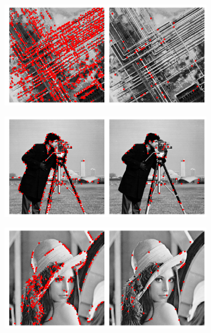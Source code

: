 \documentclass[12pt,a4paper,onecolumn]{article}
\begin{document}
\begin{figure}[H]
	\centering
	\begin{subfigure}[b]{\textwidth}
		\centering
		\includegraphics[height = 0.20\textheight]{1_bouc}
		\label{fig_1_bouc}
	\end{subfigure}
	\begin{subfigure}[b]{\textwidth}
		\centering
		\includegraphics[height = 0.20\textheight]{1_cameraman}
		\label{fig_1_cameraman}
	\end{subfigure}
	\begin{subfigure}[b]{\textwidth}
		\centering
		\includegraphics[height = 0.20\textheight]{1_lena}

\end{subfigure}
\end{figure}
\end{document}
